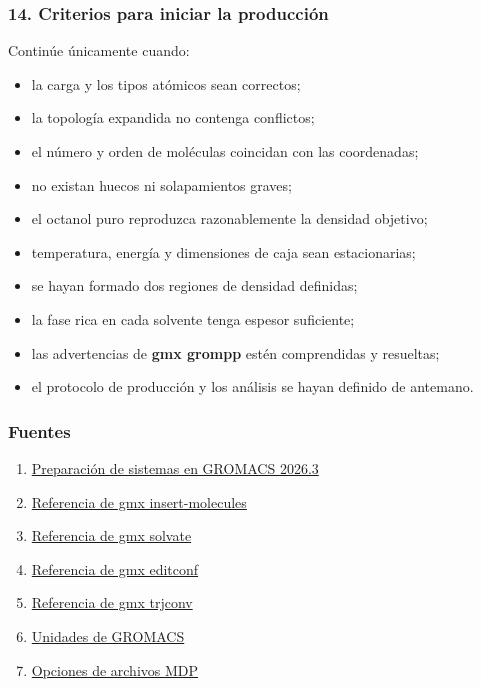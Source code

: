 \documentclass[
  spanish,
  11pt,
  a4paper]{article}
\providecommand{\tightlist}{%
  \setlength{\itemsep}{0pt}\setlength{\parskip}{0pt}}
\begin{document}
\subsubsection{14. Criterios para iniciar la
producción}\label{criterios-para-iniciar-la-producciuxf3n}

Continúe únicamente cuando:

\begin{itemize}
\tightlist
\item
  la carga y los tipos atómicos sean correctos;
\item
  la topología expandida no contenga conflictos;
\item
  el número y orden de moléculas coincidan con las coordenadas;
\item
  no existan huecos ni solapamientos graves;
\item
  el octanol puro reproduzca razonablemente la densidad objetivo;
\item
  temperatura, energía y dimensiones de caja sean estacionarias;
\item
  se hayan formado dos regiones de densidad definidas;
\item
  la fase rica en cada solvente tenga espesor suficiente;
\item
  las advertencias de \textbf{gmx grompp} estén comprendidas y
  resueltas;
\item
  el protocolo de producción y los análisis se hayan definido de
  antemano.
\end{itemize}

\subsubsection{Fuentes}\label{fuentes-3}

\begin{enumerate}
\def\labelenumi{\arabic{enumi}.}
\tightlist
\item
  \href{https://manual.gromacs.org/current/user-guide/system-preparation.html}{Preparación
  de sistemas en GROMACS 2026.3}
\item
  \href{https://manual.gromacs.org/current/onlinehelp/gmx-insert-molecules.html}{Referencia
  de gmx insert-molecules}
\item
  \href{https://manual.gromacs.org/current/onlinehelp/gmx-solvate.html}{Referencia
  de gmx solvate}
\item
  \href{https://manual.gromacs.org/current/onlinehelp/gmx-editconf.html}{Referencia
  de gmx editconf}
\item
  \href{https://manual.gromacs.org/current/onlinehelp/gmx-trjconv.html}{Referencia
  de gmx trjconv}
\item
  \href{https://manual.gromacs.org/current/reference-manual/definitions.html}{Unidades
  de GROMACS}
\item
  \href{https://manual.gromacs.org/current/user-guide/mdp-options.html}{Opciones
  de archivos MDP}
\end{enumerate}
\end{document}
